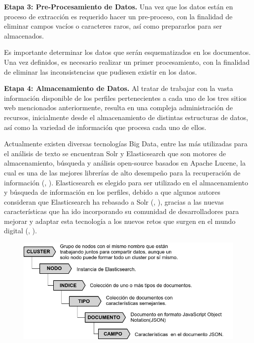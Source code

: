 \textbf{Etapa 3: Pre-Procesamiento de Datos.}
Una vez que los datos están en proceso de extracción es requerido hacer un pre-proceso, con la finalidad de eliminar campos vacíos o caracteres raros, así como prepararlos para ser almacenados. 

Es importante determinar los datos que serán esquematizados en los documentos. Una vez definidos, es necesario realizar un primer procesamiento, con la finalidad de eliminar las inconsistencias que pudiesen existir en los datos.


\textbf{Etapa 4: Almacenamiento de Datos.}
Al tratar de trabajar con la vasta informaci\'on disponible de los perfiles pertenecientes a cada uno de los tres sitios web mencionados anteriormente, resulta en una compleja administraci\'on de recursos, inicialmente desde el almacenamiento de distintas estructuras de datos, as\'i como la variedad de informaci\'on que procesa cada uno de ellos. 

Actualmente existen diversas tecnolog\'ias Big Data, entre las más utilizadas para el análisis de texto se encuentran Solr y Elasticsearch que son motores de almacenamiento, b\'usqueda y an\'alisis open-source basados en Apache Lucene, la cual es una de las mejores librer\'ias de alto desempe\~no para la recuperaci\'on de informaci\'on (\citeauthor{Lucene}, \citeyear{Lucene}). Elasticsearch es elegido para ser utilizado en el almacenamiento y b\'usqueda de informaci\'on en los perfiles, debido a que algunos autores consideran que Elasticsearch ha rebasado a Solr (\citeauthor{Apache}, \citeyear{Apache}), gracias a las nuevas caracter\'isticas que ha ido incorporando su comunidad de desarrolladores para mejorar y adaptar esta tecnolog\'ia a los nuevos retos que surgen en el mundo digital (\citeauthor{Banon}, \citeyear{Banon}). 


\begin{figure}[H]
	\centering
	\includegraphics[height=0.26\textheight]{fig01/elastic_fields}
	\label{fig:RHP02}
\end{figure}

